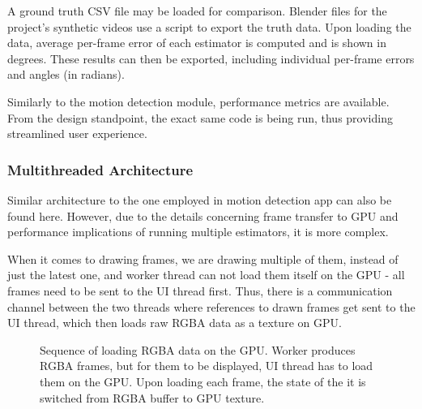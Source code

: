 \documentclass[11pt,english]{report}
\begin{document}
A ground truth CSV file may be loaded for comparison. Blender files for the project's synthetic videos use a script to export the truth data. Upon loading the data, average per-frame error of each estimator is computed and is shown in degrees. These results can then be exported, including individual per-frame errors and angles (in radians).

Similarly to the motion detection module, performance metrics are available. From the design standpoint, the exact same code is being run, thus providing streamlined user experience.

\subsubsection{Multithreaded Architecture}

Similar architecture to the one employed in motion detection app can also be found here. However, due to the details concerning frame transfer to GPU and performance implications of running multiple estimators, it is more complex.

When it comes to drawing frames, we are drawing multiple of them, instead of just the latest one, and worker thread can not load them itself on the GPU - all frames need to be sent to the UI thread first. Thus, there is a communication channel between the two threads where references to drawn frames get sent to the UI thread, which then loads raw RGBA data as a texture on GPU.

\begin{figure}[!ht]
	\centering
	\caption{\centering Sequence of loading RGBA data on the GPU. Worker produces RGBA frames, but for them to be displayed, UI thread has to load them on the GPU. Upon loading each frame, the state of the it is switched from RGBA buffer to GPU texture.}
\end{figure}
\end{document}
